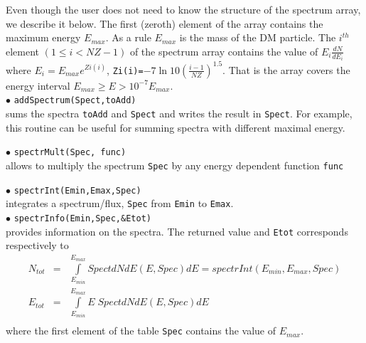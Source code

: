 \documentclass[12pt,a4paper]{article}
\begin{document}
Even though the user does not need to know the structure of the  spectrum array, we describe it below.
The first (zeroth) element of the array contains the maximum energy $E_{max}$. As a rule   $E_{max}$ is the mass of the DM particle.    
The $i^{th}$ element $(1\le i < NZ-1)$ of the spectrum array contains
the value of $E_i \frac{ dN}{dE_i} $ where  $E_i=E_{max} e^{Zi(i)}$,   
\verb|Zi(i)=|$ -7 \ln 10 \left(\frac{i-1}{NZ}\right)^{1.5}$.
 That is the array  covers the  energy interval  $E_{max} \ge E > 10^{-7}E_{max}$. \\

\noindent
$\bullet$ \verb|addSpectrum(Spect,toAdd)|\\
sums the  spectra \verb|toAdd|  and \verb|Spect| and writes the result in \verb|Spect|. For example, this routine can be useful for summing spectra 
with different  maximal energy.


\noindent
$\bullet$ \verb|spectrMult(Spec, func)|\\
allows to multiply the spectrum \verb|Spec| by any energy dependent function \verb|func|

\noindent
$\bullet$ \verb|spectrInt(Emin,Emax,Spec) | \\
integrates a spectrum/flux, \verb|Spec| from {\tt Emin} to  {\tt Emax}.\\
\noindent
$\bullet$ \verb|spectrInfo(Emin,Spec,&Etot)|\\
provides information on the spectra. The  returned value and \verb|Etot| corresponds respectively to   
\begin{eqnarray}
  N_{tot}&=&\int \limits_{E_{min}}^{E_{max}} SpectdNdE(E,Spec) dE = spectrInt(E_{min},E_{max},Spec) \\ 
  E_{tot}&=&  \int \limits_{E_{min}}^{E_{max}} E\; SpectdNdE(E,Spec)dE\\
  \nonumber
 \end{eqnarray}
where the first element of the table {\tt Spec} contains the value of   $E_{max}$.
\end{document}
